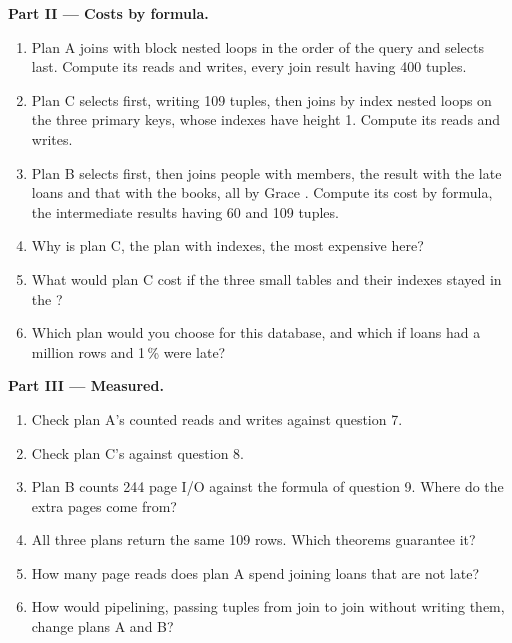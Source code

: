 \begin{problem}
\medskip\noindent\textbf{Part II --- Costs by formula.}
\begin{enumerate}[resume]
  \item Plan A joins with block nested loops in the order of the query and selects last. Compute its reads and writes, every join result having 400 tuples.
  \item Plan C selects first, writing 109 tuples, then joins by index nested loops on the three primary keys, whose indexes have height 1. Compute its reads and writes.
  \item Plan B selects first, then joins people with members, the result with the late loans and that with the books, all by Grace . Compute its cost by formula, the intermediate results having 60 and 109 tuples.
  \item Why is plan C, the plan with indexes, the most expensive here?
  \item What would plan C cost if the three small tables and their indexes stayed in the ?
  \item Which plan would you choose for this database, and which if loans had a million rows and 1\,\% were late?
\end{enumerate}

\medskip\noindent\textbf{Part III --- Measured.}
\begin{enumerate}[resume]
  \item Check plan A's counted reads and writes against question 7.
  \item Check plan C's against question 8.
  \item Plan B counts 244 page I/O against the formula of question 9. Where do the extra pages come from?
  \item All three plans return the same 109 rows. Which theorems guarantee it?
  \item How many page reads does plan A spend joining loans that are not late?
  \item How would pipelining, passing tuples from join to join without writing them, change plans A and B?
\end{enumerate}


\end{problem}
